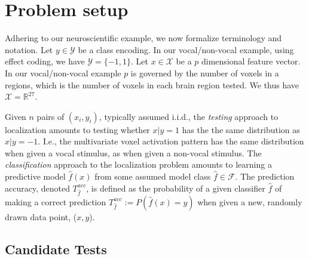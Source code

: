 \documentclass[12pt,a4paper]{article}
\newcommand{\set}[1]{\{ #1 \}} %
\newcommand{\reals}{\mathbb{R}} %
\newcommand{\features}{x} %
\newcommand{\outcomes}{y} %
\newcommand{\featureS}{\mathcal{X}} %
\newcommand{\outcomeS}{\mathcal{Y}} %
\newcommand{\hyp}{f} %
\newcommand{\hypEstim}{\hat{\hyp}} %
\newcommand{\hypclass}{\mathcal{F}}
\newcommand{\acc}{T^{acc}}
\newcommand{\prob}[1]{P\left( #1 \right)} %
\begin{document}
\section{Problem setup}
\label{sec:problem_setup}

Adhering to our neuroscientific example, we now formalize terminology and notation. 
Let $\outcomes \in \outcomeS$ be a class encoding. In our vocal/non-vocal example, using effect coding, we have $\outcomeS=\set{-1,1}$.
Let $\features \in \featureS$ be a $p$ dimensional feature vector. 
In our vocal/non-vocal example $p$ is governed by the number of voxels in a regions, which is the number of voxels in each brain region tested. We thus have $\featureS=\reals^{27}$. 

Given $n$ pairs of $(\features_i,\outcomes_i)$, typically assumed i.i.d., the \emph{testing} approach to localization amounts to testing whether $\features|\outcomes=1$ has the the same distribution as $\features|\outcomes=-1$.
I.e., the multivariate voxel activation pattern has the same distribution when given a vocal stimulus, as when given a non-vocal stimulus. 
The \emph{classification} approach to the localization problem amounts to learning a predictive model $\hypEstim(\features)$ from some assumed model class $\hypEstim \in \hypclass$. 
The prediction accuracy, denoted $\acc_{\hypEstim}$, is defined as the probability of a given classifier $\hypEstim$ of making a correct prediction $\acc_{\hypEstim}:=\prob{\hypEstim(x)=y}$ when given a new, randomly drawn data point, ($\features,\outcomes$).



\subsection{Candidate Tests}
\label{sec:considerations}
\end{document}
